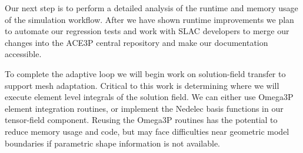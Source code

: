 \documentclass[a4paper]{article}
\begin{document}
Our next step is to perform a detailed analysis of the runtime and memory
usage of the simulation workflow.
After we have shown runtime improvements we plan to automate our regression
tests and work with SLAC developers to merge our changes into
the ACE3P central repository and make our documentation accessible.

To complete the adaptive loop we will begin work on solution-field transfer to
support mesh adaptation.
Critical to this work is determining where we will execute element level
integrals of the solution field.
We can either use Omega3P element integration routines, or implement the Nedelec
basis functions in our tensor-field component.
Reusing the Omega3P routines has the potential to reduce memory usage and code,
but may face difficulties near geometric model boundaries if parametric shape
information is not available.

\newpage 

\end{document}
